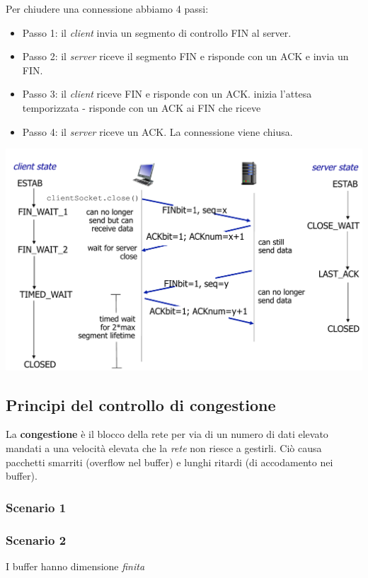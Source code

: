 Per chiudere una connessione abbiamo 4 passi: 
\begin{itemize}
  \item Passo 1: il \textit{client} invia un segmento di controllo FIN al server.
\item Passo 2: il \textit{server} riceve il segmento FIN e risponde con un ACK e invia un FIN.
\item Passo 3: il \textit{client} riceve FIN e risponde con un ACK. inizia l’attesa temporizzata - risponde con un ACK ai FIN che riceve 
\item Passo 4: il \textit{server} riceve un ACK. La connessione viene chiusa.
\end{itemize}
\includegraphics[width=\textwidth]{./img/chiusuraconnessionetcp.png}  

\subsection{Principi del controllo di congestione}
La \textbf{congestione} è il blocco della rete per via di un numero di dati elevato mandati a una velocità elevata che la \textit{rete} non riesce a gestirli. 
Ciò causa pacchetti smarriti (overflow nel buffer) e lunghi ritardi (di accodamento nei buffer). 

\subsubsection*{Scenario 1}

\subsubsection*{Scenario 2}
I buffer hanno dimensione \textit{finita}

